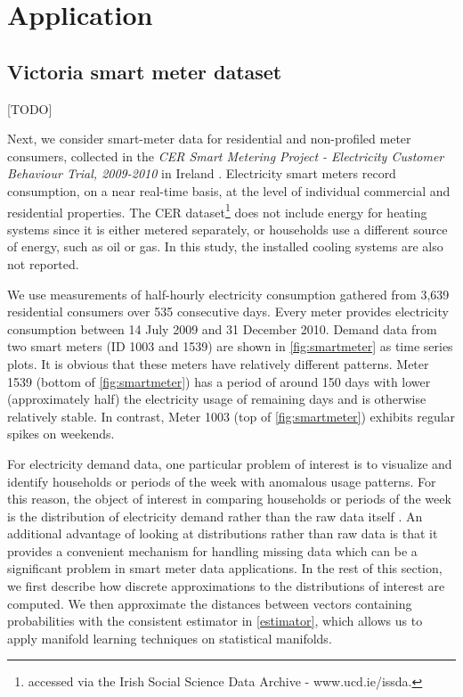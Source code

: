 \documentclass[11pt,a4paper,]{article}
\begin{document}
\hypertarget{application}{%
\section{Application}\label{application}}

\hypertarget{victoria-smart-meter-dataset}{%
\subsection{Victoria smart meter dataset}\label{victoria-smart-meter-dataset}}

{[}TODO{]}

Next, we consider smart-meter data for residential and non-profiled meter consumers, collected in the \emph{CER Smart Metering Project - Electricity Customer Behaviour Trial, 2009-2010} in Ireland \autocite{cer2012-data}. Electricity smart meters record consumption, on a near real-time basis, at the level of individual commercial and residential properties. The CER dataset\footnote{accessed via the Irish Social Science Data Archive - www.ucd.ie/issda.} does not include energy for heating systems since it is either metered separately, or households use a different source of energy, such as oil or gas. In this study, the installed cooling systems are also not reported.

We use measurements of half-hourly electricity consumption gathered from 3,639 residential consumers over 535 consecutive days. Every meter provides electricity consumption between 14 July 2009 and 31 December 2010. Demand data from two smart meters (ID 1003 and 1539) are shown in \autoref{fig:smartmeter} as time series plots. It is obvious that these meters have relatively different patterns. Meter 1539 (bottom of \autoref{fig:smartmeter}) has a period of around 150 days with lower (approximately half) the electricity usage of remaining days and is otherwise relatively stable. In contrast, Meter 1003 (top of \autoref{fig:smartmeter}) exhibits regular spikes on weekends.

For electricity demand data, one particular problem of interest is to visualize and identify households or periods of the week with anomalous usage patterns. For this reason, the object of interest in comparing households or periods of the week is the distribution of electricity demand rather than the raw data itself \autocite{Hyndman2018-ia}. An additional advantage of looking at distributions rather than raw data is that it provides a convenient mechanism for handling missing data which can be a significant problem in smart meter data applications.
In the rest of this section, we first describe how discrete approximations to the distributions of interest are computed. We then approximate the distances between vectors containing probabilities with the consistent estimator in \autoref{estimator}, which allows us to apply manifold learning techniques on statistical manifolds.
\end{document}

